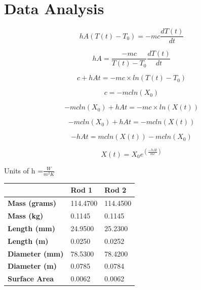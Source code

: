 \section{Data Analysis}
\begin{equation}
    hA(T(t) - T_0 ) = -mc \frac{dT(t)}{dt}
\end{equation}

\begin{equation}
    hA = \frac{-mc}{T(t) - T_0} \frac{dT(t)}{dt}
\end{equation}

\begin{equation}
   c+ hAt = -mc \times ln (T(t) - T_0)
\end{equation}

\begin{equation}
   c = -mcln (X_0)
\end{equation}

\begin{equation}
    -mcln (X_0)+ hAt = -mc \times ln (X(t))
\end{equation}

\begin{equation}
    -mcln (X_0)+ hAt = -mcln (X(t))
\end{equation}

\begin{equation}
   - hAt = mcln (X(t))  -mcln (X_0)
\end{equation}


\begin{equation}
    X(t) = X_0e^({\frac{-hAt}{mc}})
\end{equation}
\begin{center}
    
Units of h =$ \frac{W}{m^2K} $


\end{center}
\begin{center}
\begin{tabular}{|l|l|l|}
\hline
\textbf{}                                      & \textbf{Rod 1} & \textbf{Rod 2} \\ \hline
\textbf{Mass (grams)}                          & 114.4700       & 114.4500       \\ \hline
\textbf{Mass (kg)}                             & 0.1145         & 0.1145         \\ \hline
\textbf{Length (mm)}                           & 24.9500        & 25.2300        \\ \hline
\textbf{Length (m)}                            & 0.0250         & 0.0252         \\ \hline
\textbf{Diameter  (mm)}                        & 78.5300        & 78.4200        \\ \hline
\textbf{Diameter (m)}                          & 0.0785         & 0.0784         \\ \hline
\textbf{Surface Area }   & 0.0062         & 0.0062         \\ \hline
\end{tabular}
\end{center}


